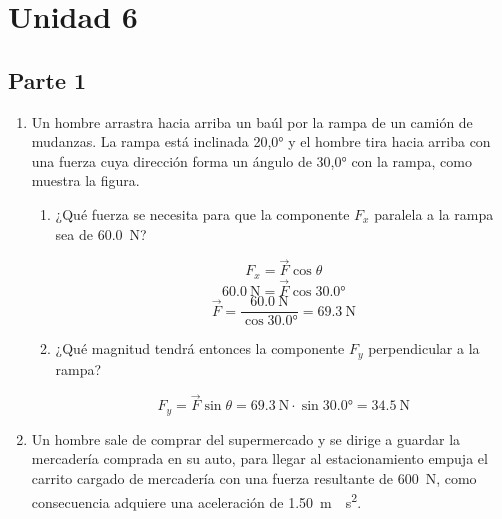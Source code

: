 \documentclass[Física - Práctica.root.tex]{subfiles}
\begin{document}
\section{Unidad 6}
\subsection{Parte 1}
\begin{enumerate}
  \item Un hombre arrastra hacia arriba un baúl por la rampa de un camión de mudanzas. La rampa está inclinada \ang{20,0} y el hombre tira hacia arriba con una fuerza cuya dirección forma un ángulo de \ang{30,0} con la rampa, como muestra la figura.

        \begin{center}
        \end{center}

        \begin{enumerate}
          \item ¿Qué fuerza se necesita para que la componente $F_x$ paralela a la rampa sea de \SI{60,0}{\newton}?

                \[F_x=\vec{F}\cos{\theta}\]
                \[\SI{60,0}{\newton}=\vec{F}\cos{\ang{30,0}}\]
                \[\vec{F}=\frac{\SI{60,0}{\newton}}{\cos{\ang{30,0}}}=\boxed{\SI{69,3}{\newton}}\]

          \item ¿Qué magnitud tendrá entonces la componente $F_y$ perpendicular a la rampa?

                \[F_y=\vec{F}\sin{\theta}=\SI{69,3}{\newton}\cdot\sin{\ang{30,0}}=\boxed{\SI{34,5}{\newton}}\]
        \end{enumerate}

  \item Un hombre sale de comprar del supermercado y se dirige a guardar la mercadería comprada en su auto, para llegar al estacionamiento empuja el carrito cargado de mercadería con una fuerza resultante de \SI{600}{\newton}, como consecuencia adquiere una aceleración de \SI{1,50}{\meter\over\second\squared}.


\end{enumerate}
\end{document}
